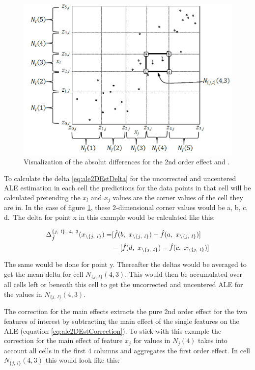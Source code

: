 \documentclass[
]{krantz}
\begin{document}
\begin{figure}
\includegraphics[width=1\linewidth]{images/ale_1_ALE_2D_estimation} \caption{Visualization of the absolut differences for the 2nd order effect \citep[page 13]{Apley2016} and \citep{molnar2019}.}\label{fig:ale2DEstimation}
\end{figure}



To calculate the delta \eqref{eq:ale2DEstDelta} for the uncorrected and uncentered ALE estimation in each cell the predictions for the data points in that cell will be calculated pretending the \(x_l\) and \(x_j\) values are the corner values of the cell they are in. In the case of figure \ref{fig:ale2DEstimation}, these 2-dimensional corner values would be a, b, c, d.~The delta for point x in this example would be calculated like this:

\begin{align}
\Delta_{\hat f}^{{\{j,~l\}}, ~4,~3} (x_{\setminus\{j,~l\}}) = 
& [\hat f(b, ~x_{\setminus\{j,~l\}}) - \hat f(a, ~x_{\setminus\{j,~l\}})] \notag \\
&- [\hat f(d, ~x_{\setminus\{j,~l\}}) - \hat f(c, ~x_{\setminus\{j,~l\}})] \notag
\end{align}

The same would be done for point y. Thereafter the deltas would be averaged to get the mean delta for cell \(N_{\{j,~l\}}(4,3)\). This would then be accumulated over all cells left or beneath this cell to get the uncorrected and uncentered ALE for the values in \(N_{\{j,~l\}}(4,3)\).

The correction for the main effects extracts the pure 2nd order effect for the two features of interest by subtracting the main effect of the single features on the ALE (equation \eqref{eq:ale2DEstCorrection}). To stick with this example the correction for the main effect of feature \(x_j\) for values in \(N_j(4)\) takes into account all cells in the first 4 columns and aggregates the first order effect. In cell \(N_{\{j,~l\}}(4,3)\) this would look like this:
\end{document}
